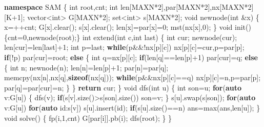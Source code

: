 \documentclass[
]{article}
\newenvironment{Shaded}{}{}
\newcommand{\ControlFlowTok}[1]{\textcolor[rgb]{0.00,0.44,0.13}{\textbf{#1}}}
\newcommand{\DataTypeTok}[1]{\textcolor[rgb]{0.56,0.13,0.00}{#1}}
\newcommand{\DecValTok}[1]{\textcolor[rgb]{0.25,0.63,0.44}{#1}}
\newcommand{\KeywordTok}[1]{\textcolor[rgb]{0.00,0.44,0.13}{\textbf{#1}}}
\newcommand{\NormalTok}[1]{#1}
\begin{document}
\begin{Shaded}
\begin{Highlighting}[]
\KeywordTok{namespace}\NormalTok{ SAM}
\NormalTok{\{}
    \DataTypeTok{int}\NormalTok{ root,cnt;}
    \DataTypeTok{int}\NormalTok{ len[MAXN*}\DecValTok{2}\NormalTok{],par[MAXN*}\DecValTok{2}\NormalTok{],nx[MAXN*}\DecValTok{2}\NormalTok{][K+}\DecValTok{1}\NormalTok{];}
\NormalTok{    vector\textless{}}\DataTypeTok{int}\NormalTok{\textgreater{} G[MAXN*}\DecValTok{2}\NormalTok{];}
\NormalTok{    set\textless{}}\DataTypeTok{int}\NormalTok{\textgreater{} s[MAXN*}\DecValTok{2}\NormalTok{];}
    \DataTypeTok{void}\NormalTok{ newnode(}\DataTypeTok{int}\NormalTok{ \&x)}
\NormalTok{    \{}
\NormalTok{        x=++cnt;}
\NormalTok{        G[x].clear();}
\NormalTok{        s[x].clear();}
\NormalTok{        len[x]=par[x]=}\DecValTok{0}\NormalTok{;}
\NormalTok{        mst(nx[x],}\DecValTok{0}\NormalTok{);}
\NormalTok{    \}}
    \DataTypeTok{void}\NormalTok{ init()\{cnt=}\DecValTok{0}\NormalTok{,newnode(root);\}}
    \DataTypeTok{int}\NormalTok{ extend(}\DataTypeTok{int}\NormalTok{ c,}\DataTypeTok{int}\NormalTok{ last)}
\NormalTok{    \{}
        \DataTypeTok{int}\NormalTok{ cur;}
\NormalTok{        newnode(cur);}
\NormalTok{        len[cur]=len[last]+}\DecValTok{1}\NormalTok{;}
        \DataTypeTok{int}\NormalTok{ p=last;}
        \ControlFlowTok{while}\NormalTok{(p\&\&!nx[p][c])}
\NormalTok{            nx[p][c]=cur,p=par[p];}
        \ControlFlowTok{if}\NormalTok{(!p) par[cur]=root;}
        \ControlFlowTok{else}
\NormalTok{        \{}
            \DataTypeTok{int}\NormalTok{ q=nx[p][c];}
            \ControlFlowTok{if}\NormalTok{(len[q]==len[p]+}\DecValTok{1}\NormalTok{) par[cur]=q;}
            \ControlFlowTok{else}
\NormalTok{            \{}
                \DataTypeTok{int}\NormalTok{ n;}
\NormalTok{                newnode(n);}
\NormalTok{                len[n]=len[p]+}\DecValTok{1}\NormalTok{;}
\NormalTok{                par[n]=par[q];}
\NormalTok{                memcpy(nx[n],nx[q],}\KeywordTok{sizeof}\NormalTok{(nx[q]));}
                \ControlFlowTok{while}\NormalTok{(p\&\&nx[p][c]==q)}
\NormalTok{                    nx[p][c]=n,p=par[p];}
\NormalTok{                par[q]=par[cur]=n;}
\NormalTok{            \}}
\NormalTok{        \}}
        \ControlFlowTok{return}\NormalTok{ cur;}
\NormalTok{    \}}
    \DataTypeTok{void}\NormalTok{ dfs(}\DataTypeTok{int}\NormalTok{ u)}
\NormalTok{    \{}
        \DataTypeTok{int}\NormalTok{ son=u;}
        \ControlFlowTok{for}\NormalTok{(}\KeywordTok{auto}\NormalTok{ v:G[u])}
\NormalTok{        \{}
\NormalTok{            dfs(v);}
            \ControlFlowTok{if}\NormalTok{(s[v].size()\textgreater{}s[son].size())}
\NormalTok{                son=v;}
\NormalTok{        \}}
\NormalTok{        s[u].swap(s[son]);}
        \ControlFlowTok{for}\NormalTok{(}\KeywordTok{auto}\NormalTok{ v:G[u])}
            \ControlFlowTok{for}\NormalTok{(}\KeywordTok{auto}\NormalTok{ id:s[v])}
\NormalTok{                s[u].insert(id);}
        \ControlFlowTok{if}\NormalTok{(s[u].size()==n)}
\NormalTok{            ans=max(ans,len[u]);}
\NormalTok{    \}}
    \DataTypeTok{void}\NormalTok{ solve()}
\NormalTok{    \{}
\NormalTok{        fp(i,}\DecValTok{1}\NormalTok{,cnt)}
\NormalTok{            G[par[i]].pb(i);}
\NormalTok{        dfs(root);}
\NormalTok{    \}}
\NormalTok{\}}


\end{Highlighting}
\end{Shaded}
\end{document}
